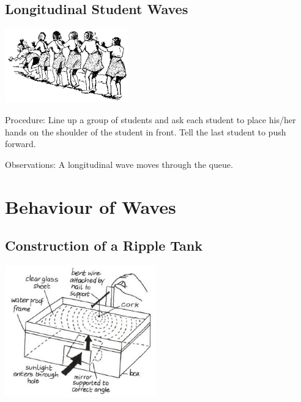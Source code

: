 \begin{multicols}{2}
\subsection{Longitudinal Student Waves}

\begin{center}
\includegraphics[width=0.4\textwidth]{./img/source/longitudinal-waves.png}
\end{center}

\begin{description*}
\item[Procedure:]{Line up a group of students and ask each student to place his/her hands on the shoulder of the student in front. Tell the last student to push forward.}
\item[Observations:]{A longitudinal wave moves through the queue.}
\end{description*}


\section*{Behaviour of Waves}


\subsection{Construction of a Ripple Tank}

\begin{center}
\includegraphics[width=0.49\textwidth]{./img/vso/ripple-tank.png}
\end{center}


\end{multicols}
